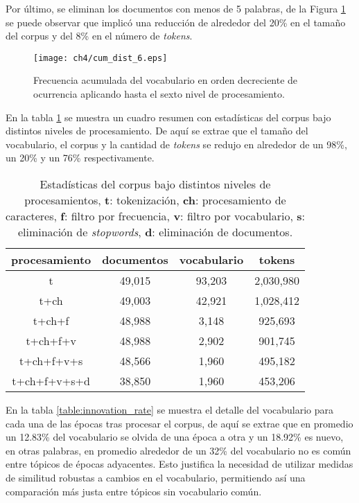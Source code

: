 Por último, se eliminan los documentos con menos de 5 palabras, de la Figura \ref{img:cum_dist6} se puede observar que implicó una reducción de alrededor del 20\% en el tamaño del corpus y del 8\% en el número de \textit{tokens}.

\begin{figure}
    \centering
    \texttt{[image: ch4/cum\_dist\_6.eps]}
    \caption{Frecuencia acumulada del vocabulario en orden decreciente de ocurrencia aplicando hasta el sexto nivel de procesamiento.}
    \label{img:cum_dist6}
\end{figure}

En la tabla \ref{table:processing_stats} se muestra un cuadro resumen con estadísticas del corpus bajo distintos niveles de procesamiento. De aquí se extrae que el tamaño del vocabulario, el corpus y la cantidad de \textit{tokens} se redujo en alrededor de un 98\%, un 20\% y un 76\% respectivamente.

\begin{table}[H]
    \begin{tabular}{|c|c|c|c|}
    \hline
    procesamiento & documentos & vocabulario & tokens  \\ \hline
    t             & 49,015      & 93,203       & 2,030,980 \\ \hline
    t+ch          & 49,003      & 42,921       & 1,028,412 \\ \hline
    t+ch+f        & 48,988      & 3,148        & 925,693  \\ \hline
    t+ch+f+v      & 48,988      & 2,902        & 901,745  \\ \hline
    t+ch+f+v+s    & 48,566      & 1,960        & 495,182  \\ \hline
    t+ch+f+v+s+d  & 38,850      & 1,960        & 453,206  \\ \hline
    \end{tabular}
    \caption{Estadísticas del corpus bajo distintos niveles de procesamientos, \textbf{t}: tokenización, \textbf{ch}: procesamiento de caracteres, \textbf{f}: filtro por frecuencia, \textbf{v}: filtro por vocabulario, \textbf{s}: eliminación de \textit{stopwords}, \textbf{d}: eliminación de documentos.}
    \label{table:processing_stats}
    \end{table}

En la tabla \ref{table:innovation_rate} se muestra el detalle del vocabulario para cada una de las épocas tras procesar el corpus, de aquí se extrae que en promedio un 12.83\% del vocabulario se olvida de una época a otra y un 18.92\% es nuevo, en otras palabras, en promedio alrededor de un 32\% del vocabulario no es común entre tópicos de épocas adyacentes. Esto justifica la necesidad de utilizar medidas de similitud robustas a cambios en el vocabulario, permitiendo así una comparación más justa entre tópicos sin vocabulario común.

